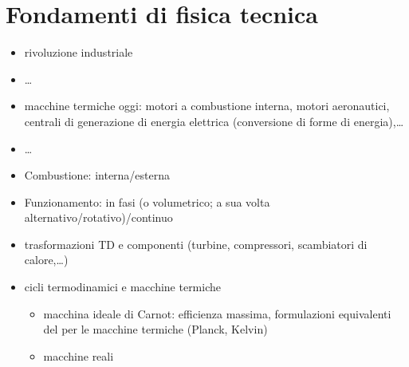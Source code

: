 \documentclass[letterpaper,10pt,italian]{jupyterBook}
\begin{document}
\sphinxstepscope


\chapter{Fondamenti di fisica tecnica}
\label{\detokenize{ch/thermodynamics/heat-engine:fondamenti-di-fisica-tecnica}}\label{\detokenize{ch/thermodynamics/heat-engine:physics-hs-thermodynamics-heat-engine}}\label{\detokenize{ch/thermodynamics/heat-engine::doc}}
\sphinxAtStartPar
{}
\begin{itemize}
\item {} 
\sphinxAtStartPar
rivoluzione industriale

\item {} 
\sphinxAtStartPar
…

\item {} 
\sphinxAtStartPar
macchine termiche oggi: motori a combustione interna, motori aeronautici, centrali di generazione di energia elettrica (conversione di forme di energia),…

\item {} 
\sphinxAtStartPar
…

\end{itemize}

\sphinxAtStartPar
{}
\begin{itemize}
\item {} 
\sphinxAtStartPar
Combustione: interna/esterna

\item {} 
\sphinxAtStartPar
Funzionamento: in fasi (o volumetrico; a sua volta alternativo/rotativo)/continuo

\end{itemize}

\sphinxAtStartPar
{}
\begin{itemize}
\item {} 
\sphinxAtStartPar
trasformazioni TD e componenti (turbine, compressori, scambiatori di calore,…)

\item {} 
\sphinxAtStartPar
cicli termodinamici e macchine termiche
\begin{itemize}
\item {} 
\sphinxAtStartPar
macchina ideale di Carnot: efficienza massima, formulazioni equivalenti del  per le macchine termiche (Planck, Kelvin)

\item {} 
\sphinxAtStartPar
macchine reali

\end{itemize}

\end{itemize}
\end{document}
